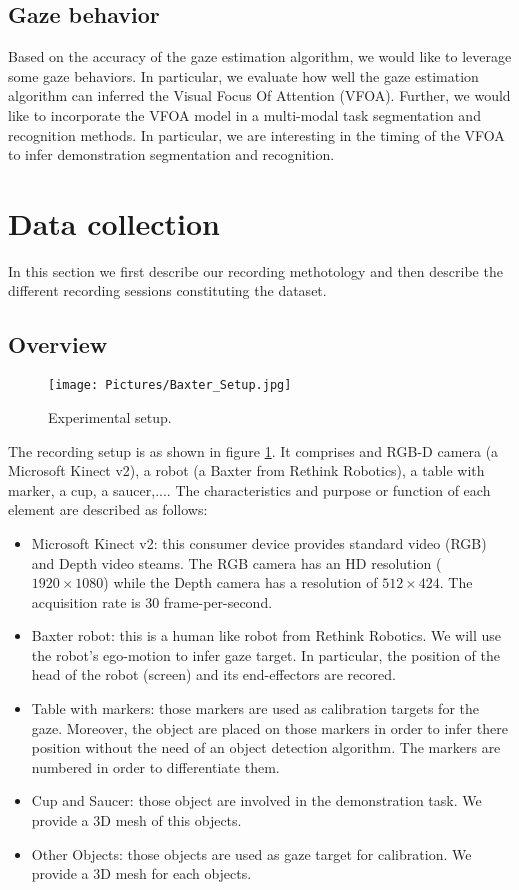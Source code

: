 \documentclass[11pt,a4paper]{article}
\begin{document}
\subsection{Gaze behavior}
Based on the accuracy of the gaze estimation algorithm, we would like to leverage some gaze behaviors. In particular, we evaluate how well the gaze estimation algorithm can inferred the Visual Focus Of Attention (VFOA). Further, we would like to incorporate the VFOA model in a multi-modal task segmentation and recognition methods. In particular, we are interesting in the timing of the VFOA to infer demonstration segmentation and recognition.

\section{Data collection}
\label{Data_Collection}
In this section we first describe our recording methotology and then describe the different recording sessions constituting the dataset.
\subsection{Overview}
\label{Overview}
\begin{figure}[!ht]
\begin{center}
\texttt{[image: Pictures/Baxter\_Setup.jpg]}
\end{center}
\caption{Experimental setup. \label{Experimental_Setup}}
\end{figure}
The recording setup is as shown in figure \ref{Experimental_Setup}. It comprises and RGB-D camera (a Microsoft Kinect v2), a robot (a Baxter from Rethink Robotics), a table with marker, a cup, a saucer,.... The characteristics and purpose or function of each element are described as follows:
\begin{itemize}
\item Microsoft Kinect v2: this consumer device provides standard video (RGB) and Depth video steams. The RGB camera has an HD resolution ($1920 \times 1080$) while the Depth camera has a resolution of $512 \times 424$. The acquisition rate is 30 frame-per-second.
\item Baxter robot: this is a human like robot from Rethink Robotics. We will use the robot's ego-motion to infer gaze target. In particular, the position of the head of the robot (screen) and its end-effectors are recored.
\item Table with markers: those markers are used as calibration targets for the gaze. Moreover, the object are placed on those markers in order to infer there position without the need of an object detection algorithm. The markers are numbered in order to differentiate them.
\item Cup and Saucer: those object are involved in the demonstration task. We provide a 3D mesh of this objects.
\item Other Objects: those objects are used as gaze target for calibration. We provide a 3D mesh for each objects.
\end{itemize}
\end{document}
